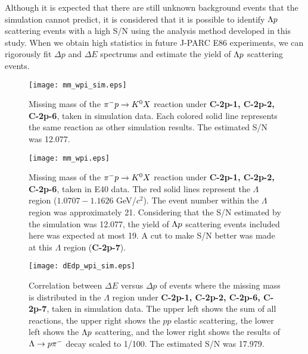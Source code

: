 Although it is expected that there are still unknown background events that the simulation cannot predict, it is considered that it is possible to identify $\Lambda p$ scattering events with a high S/N using the analysis method developed in this study. When we obtain high statistics in future J-PARC E86 experiments, we can rigorously fit $\Delta p$ and $\Delta E$ spectrums and estimate the yield of $\Lambda p$ scattering events. 

\begin{figure}[!h]
  \begin{center}
    \texttt{[image: mm\_wpi\_sim.eps]}
    \caption{Missing mass of the $\pi^- p \to K^0 X$ reaction under {\bf C-2p-1, C-2p-2, C-2p-6}, taken in simulation data. Each colored solid line represents the same reaction as other simulation results. The estimated S/N was 12.077.}
    \label{fig-mm_wopi_sim}
  \end{center}
\end{figure}

\begin{figure}[!h]
  \begin{center}
    \texttt{[image: mm\_wpi.eps]}
    \caption{Missing mass of the $\pi^- p \to K^0 X$ reaction under {\bf C-2p-1, C-2p-2, C-2p-6}, taken in E40 data. The red solid lines represent the $\Lambda$ region ($1.0707-1.1626$ GeV/$c^{2}$). The event number within the $\Lambda$ region was approximately 21. Considering that the S/N estimated by the simulation was 12.077, the yield of $\Lambda p$ scattering events included here was expected at most 19. A cut to make S/N better was made at this $\Lambda$ region ({\bf C-2p-7}).}
    \label{fig-mm_wopi}
  \end{center}
\end{figure}

\begin{figure}[!h]
  \begin{center}
    \texttt{[image: dEdp\_wpi\_sim.eps]}
    \caption{Correlation between $\Delta E$ versus $\Delta p$ of events where the missing mass is distributed in the $\Lambda$ region under {\bf C-2p-1, C-2p-2, C-2p-6, C-2p-7}, taken in simulation data. The upper left shows the sum of all reactions, the upper right shows the $pp$ elastic scattering, the lower left shows the $\Lambda p$ scattering, and the lower right shows the results of $\Lambda\to p\pi^{-}$ decay scaled to 1/100. The estimated S/N was 17.979.}
    \label{fig-dEdp_wopi_sim}
  \end{center}
\end{figure}

